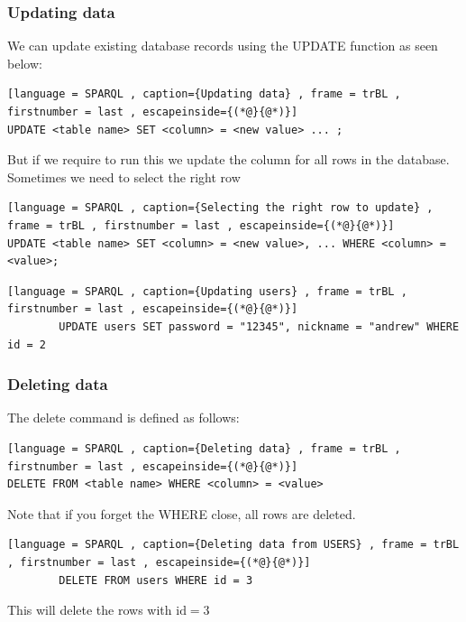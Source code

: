 \documentclass[a4paper]{article}
\theoremstyle{plain}
\theoremstyle{definition}
\newtheorem{exmp}{Example}[section]
\theoremstyle{remark}
\begin{document}
\begin{flushleft}
\subsubsection{Updating data}
We can update existing database records using the UPDATE function as seen below:
\begin{lstlisting}[language = SPARQL , caption={Updating data} , frame = trBL , firstnumber = last , escapeinside={(*@}{@*)}]
UPDATE <table name> SET <column> = <new value> ... ;
\end{lstlisting}
But if we require to run this we update the column for all rows in the database. Sometimes we need to select the right row
\begin{lstlisting}[language = SPARQL , caption={Selecting the right row to update} , frame = trBL , firstnumber = last , escapeinside={(*@}{@*)}]
UPDATE <table name> SET <column> = <new value>, ... WHERE <column> = <value>;
\end{lstlisting}
\begin{tcolorbox}[colback=black!3!white,colframe=black!60!white,title=\begin{exmp}Editing existing values \label{Editing existing values}\end{exmp}]
        \begin{lstlisting}[language = SPARQL , caption={Updating users} , frame = trBL , firstnumber = last , escapeinside={(*@}{@*)}]
        UPDATE users SET password = "12345", nickname = "andrew" WHERE id = 2
        \end{lstlisting}
\end{tcolorbox}
\subsubsection{Deleting data}
The delete command is defined as follows:
\begin{lstlisting}[language = SPARQL , caption={Deleting data} , frame = trBL , firstnumber = last , escapeinside={(*@}{@*)}]
DELETE FROM <table name> WHERE <column> = <value>
\end{lstlisting}
Note that if you forget the WHERE close, all rows are deleted.
\begin{tcolorbox}[colback=black!3!white,colframe=black!60!white,title=\begin{exmp}Users deletion \label{Users deletion}\end{exmp}]
        \begin{lstlisting}[language = SPARQL , caption={Deleting data from USERS} , frame = trBL , firstnumber = last , escapeinside={(*@}{@*)}]
        DELETE FROM users WHERE id = 3
        \end{lstlisting}
	This will delete the rows with $\text{id} = 3$
\end{tcolorbox}

\end{flushleft}
\end{document}
